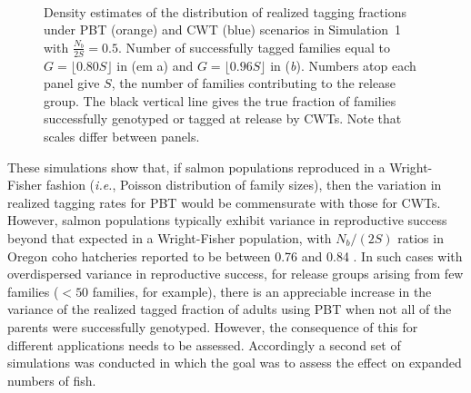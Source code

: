 \documentclass[11pt]{article}
\newcommand{\ie}{{\em i.e.},\xspace }
\begin{document}
\begin{figure}
\centering
\mbox{
	~~~~~
}
\caption{Density estimates of the distribution of realized tagging fractions under PBT (orange) and CWT (blue) scenarios
in Simulation~1 with $\frac{N_b}{2S} = 0.5$. Number of successfully tagged families
equal to $G = \lfloor0.80S\rfloor$ in ({em a}) and $G = \lfloor0.96S\rfloor$ in ({\em b}).  Numbers
atop each panel give $S$, the number of families contributing to the release group. The black vertical line
gives the true fraction of families successfully genotyped or tagged at release by CWTs. Note that
scales differ between panels.}
\label{fig:Ne50}
\end{figure}




These simulations show that, if salmon populations reproduced in a Wright-Fisher fashion
(\ie Poisson distribution of family sizes), then the variation in
realized tagging rates for PBT would be commensurate with those for CWTs.  However, salmon populations
typically exhibit variance in reproductive success beyond that expected in a Wright-Fisher population, with
$N_b/(2S)$ ratios in  Oregon coho hatcheries reported to be between 0.76 and 0.84  \citet{Moyeretal2007}. 
 In such cases with overdispersed variance in reproductive success,
for release groups arising from few families ($<50$ families, for example),
there is an appreciable increase in the variance of the realized tagged fraction of adults using PBT when
not all of the parents were successfully genotyped.  However,
the consequence of this for different applications needs to be assessed. Accordingly a second set of simulations
was conducted in which the goal was to assess the effect on expanded numbers of fish. 
\end{document}
